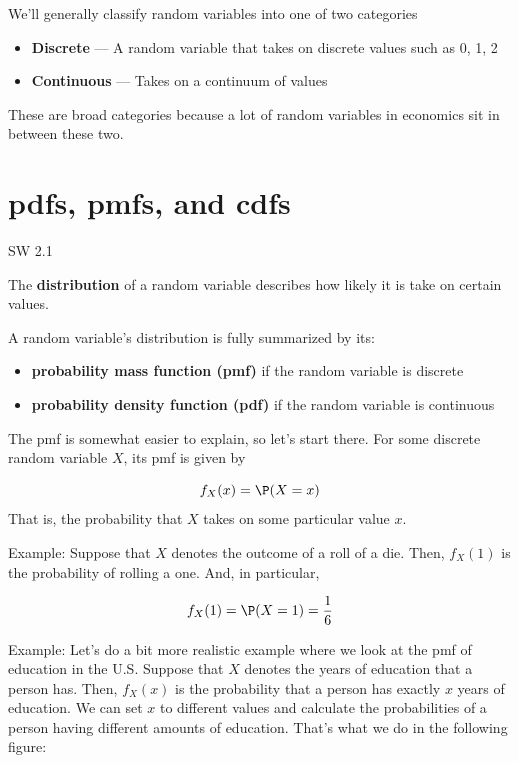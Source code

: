 \documentclass[
  letterpaper,
  DIV=11,
  numbers=noendperiod]{scrreprt}
\begin{document}
We'll generally classify random variables into one of two categories

\begin{itemize}
\item
  \textbf{Discrete} --- A random variable that takes on discrete values
  such as 0, 1, 2
\item
  \textbf{Continuous} --- Takes on a continuum of values
\end{itemize}

These are broad categories because a lot of random variables in
economics sit in between these two.

\section{pdfs, pmfs, and cdfs}\label{pdfs-pmfs-and-cdfs}

SW 2.1

The \textbf{distribution} of a random variable describes how likely it
is take on certain values.

A random variable's distribution is fully summarized by its:

\begin{itemize}
\item
  \textbf{probability mass function (pmf)} if the random variable is
  discrete
\item
  \textbf{probability density function (pdf)} if the random variable is
  continuous
\end{itemize}

The pmf is somewhat easier to explain, so let's start there. For some
discrete random variable \(X\), its pmf is given by

\[
  f_X(x) = \P(X=x)
\] That is, the probability that \(X\) takes on some particular value
\(x\).

{Example: } Suppose that \(X\) denotes the outcome of a roll of a die.
Then, \(f_X(1)\) is the probability of rolling a one. And, in
particular,

\[
  f_X(1) = \P(X=1) = \frac{1}{6}
\]

{Example: } Let's do a bit more realistic example where we look at the
pmf of education in the U.S. Suppose that \(X\) denotes the years of
education that a person has. Then, \(f_X(x)\) is the probability that a
person has exactly \(x\) years of education. We can set \(x\) to
different values and calculate the probabilities of a person having
different amounts of education. That's what we do in the following
figure:
\end{document}
